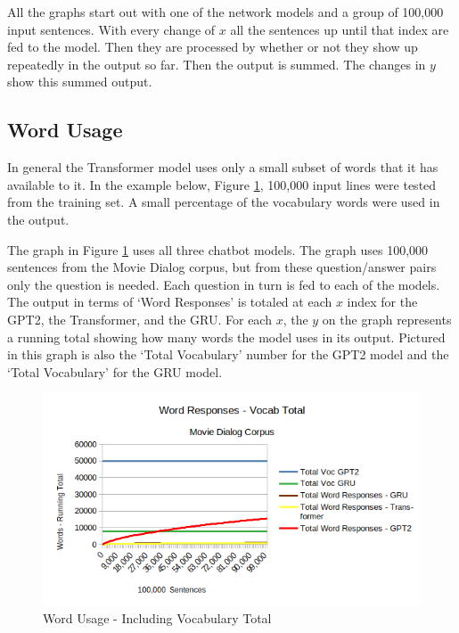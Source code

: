 All the graphs start out with one of the network models and a group of 100,000 input sentences. With every change of $x$ all the sentences up until that index are fed to the model. Then they are processed by whether or not they show up repeatedly in the output so far. Then the output is summed. The changes in $y$ show this summed output.

\subsection{Word Usage}

In general the Transformer model uses only a small subset of words that it has available to it. In the example below, Figure \ref{diagram-words-with-voc-total}, 100,000 input lines were tested from the training set. A small percentage of the vocabulary words were used in the output. %

The graph in Figure \ref{diagram-words-with-voc-total} uses all three chatbot models. The graph uses 100,000 sentences from the Movie Dialog corpus, but from these question/answer pairs only the question is needed. Each question in turn is fed to each of the models. The output in terms of `Word Responses' is totaled at each $x$ index for the GPT2, the Transformer, and the GRU. For each $x$, the $y$ on the graph represents a running total showing how many words the model uses in its output. Pictured in this graph is also the `Total Vocabulary' number for the GPT2 model and the `Total Vocabulary' for the GRU model.

\begin{figure}[H]
	\begin{center}
		\includegraphics[scale=0.75]{diagram-100000-vocab}
		
		
	\end{center}
	\caption[Word Usage]{Word Usage - Including Vocabulary Total}
	\label{diagram-words-with-voc-total}
	
\end{figure}

